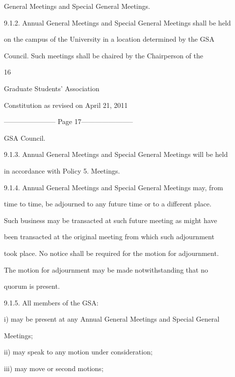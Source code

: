 \documentclass{article}
\begin{document}
General Meetings and Special General Meetings.  



9.1.2. Annual General Meetings and Special General Meetings shall be held  

on the campus of the University in a location determined by the GSA  

Council.  Such  meetings  shall  be  chaired  by  the  Chairperson  of  the  



       

    16  



      Graduate Students’ Association  



 Constitution as revised on April 21, 2011  


----------------------- Page 17-----------------------

GSA Council.  



9.1.3. Annual General Meetings and Special General Meetings will be held  

in accordance with Policy 5. Meetings.  



9.1.4. Annual  General  Meetings  and  Special  General  Meetings  may,  from  

time to time, be adjourned to any future time or to a different place.  

Such business may be transacted at such future meeting as might have  

been transacted at the original meeting from which such adjournment  

took place. No notice shall be required for the motion for adjournment.  

The  motion  for  adjournment  may  be  made  notwithstanding  that  no  

quorum is present.  



9.1.5. All members of the GSA:  



i)      may be present at any Annual General Meetings and Special General  

Meetings;  



ii)     may speak to any motion under consideration;  



iii)    may move or second motions;  
\end{document}
